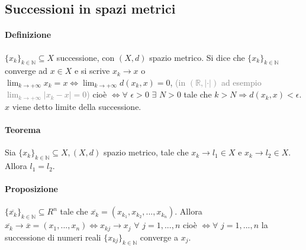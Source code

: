 \documentclass{article}
\newcommand{\R}{\mathbb{R}}
\newcommand{\N}{\mathbb{N}}
\begin{document}
\subsection{Successioni in spazi metrici}

\paragraph{{Definizione}}
$\{x_k\}_{k\in \N} \subseteq X$ successione, con $(X,d)$ spazio metrico. Si dice che $\{ x_k\}_{k\in\N}$ converge ad $x \in X$ e si scrive
$x_k \rightarrow x$ o $\lim_{k\rightarrow +\infty} x_k = x \Leftrightarrow \lim_{k \rightarrow +\infty} d(x_k,x)=0$,
\textcolor{grey}{(in $(\R,|\cdot|)$ ad esempio $\lim_{k \rightarrow+\infty} |x_k - x |=0$)} cioè $\Leftrightarrow \forall \,\, \epsilon >0 \,\, \exists\,\, N >0 $ tale che $k > N \Rightarrow d(x_k,x)<\epsilon$.
$x$ viene detto limite della successione.

\paragraph{{Teorema}}
Sia $\{ x_k \}_{k \in \N} \subseteq X, (X,d)$ spazio metrico, tale che $ x_k \rightarrow l_1 \in X$ e $x_k \rightarrow l_2 \in X$. Allora $l_1=l_2$.

\paragraph{{Proposizione}}
$\{\overline{x_k}\}_{k\in\N} \subseteq R^n$ tale che $\overline{x_k } = (x_{k_1},x_{k_2},...,x_{k_n})$. Allora $\overline{x_k}\rightarrow \overline{x}=(x_1,...,x_n) \Leftrightarrow x_{kj} \rightarrow x_j \,\,  \forall \,\, j=1,...,n$ cioè $\Leftrightarrow \forall \,\, j = 1,...,n$ la successione di numeri reali $\{ x_{kj}\}_{k\in\N}$ converge a $x_j$.
\end{document}
